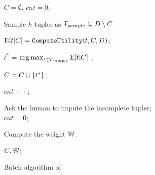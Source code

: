 
 \begin{figure}[!t]
 \vspace{-1em}
	\begin{algorithm}[H]
		\normalem
	\caption{Batch algorithm of \ours~\label{alg:batch}}
		{\small
			
			$C=\emptyset$, $cnt = 0$;\\
			
			\While{$|\core|< \numcore$}
			{
				
				Sample $h$ tuples as $T_{sample} \subseteq D \setminus C$\\
				{
					
				$\mathrm{E}[t|C]=\texttt{ComputeUtility}(t, C,D)$;\\%
			}		
			
			$t^*$ = $\operatorname*{arg\,max}_{t\in T_{sample}}\mathrm{E}[t|C]$ ;\\
			
			$C = C \cup \{t^*\}$; \\
			
			{ 
				$cnt++$; \\
			}
			
			{
				Ask the human to impute the incomplete tuples;\\
				$cnt = 0$; \\
			}			
			
		}
	
	 Compute the weight $\mathbb{W}$.\\
	\iffalse	\For{$j = 1$ to $|\core|$} 
		{\nllabel{batch:cc0}
			$w_j = \sum_{i=1}^{n}\mathbb{I}[j=\argmin_{c_{j'}\in\core}  \max\limits_{\hypo\in\vartheta}\lVert \df_i(\hypo) - \df_{\gamma(j')}(\hypo) \rVert ]$;\\\nllabel{batch:cc}
		} \fi
		\Return $C,\mathbb{W}$;\\
		}
	\end{algorithm}
\vspace{-2em}
\end{figure}